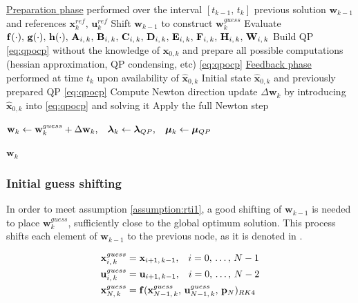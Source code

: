 \begin{algorithm}[H]
	\caption{\textsc{RTI}}\label{alg:rti}
	\centering
	\footnotesize
	\begin{algorithmic}[1]
	\Statex \underline{Preparation phase} performed over the interval $\left[t_{k-1},\,t_k\right]$
	\Require previous solution $\mathbf{w}_{k-1}$ and references $\mathbf{x}_k^{ref},\,\mathbf{u}_k^{ref}$
	\State Shift $\mathbf{w}_{k-1}$ to construct $\mathbf{w}_k^{guess}$
	\State Evaluate $\mathbf{f}(\cdot),\, \mathbf{g}(\cdot),\,\mathbf{h}(\cdot),\,\mathbf{A}_{i,\,k},\,\mathbf{B}_{i,\,k},\,\mathbf{C}_{i,\,k},\,\mathbf{D}_{i,\,k},\,\mathbf{E}_{i,\,k},\,\mathbf{F}_{i,\,k},\,\mathbf{H}_{i,\,k},\,\mathbf{W}_{i,\,k}$
	\State Build QP \eqref{eq:qpocp} without the knowledge of $\mathbf{\hat{x}}_{0, k}$ and prepare all possible computations (hessian approximation, QP condensing, etc)
	\State \Return \eqref{eq:qpocp}
	\Statex \underline{Feedback phase} performed at time $t_k$ upon availability of $\mathbf{\hat{x}}_{0, k}$
	\Require Initial state $\mathbf{\hat{x}}_{0, k}$ and previously prepared QP \eqref{eq:qpocp}
	\State Compute Newton direction update $\Delta \mathbf{w}_k$ by introducing $\mathbf{\hat{x}}_{0, k}$ into \eqref{eq:qpocp} and solving it
	\State Apply the full Newton step
	\Statex \centerline{$\mathbf{w}_k \gets \mathbf{w}_{k}^{guess} + \Delta \mathbf{w}_{k},\hspace{0.3cm}\bm{\gmultiplier}_k \gets \bm{\gmultiplier}_{QP},\hspace{0.3cm}\bm{\hmultiplier}_k \gets \bm{\hmultiplier}_{QP}$}
	\State \Return $\mathbf{w}_k$
	\end{algorithmic}
\end{algorithm}

\subsubsection*{Initial guess shifting}

In order to meet assumption \ref{assumption:rti1}, a good shifting of $\mathbf{w}_{k-1}$ is needed to place $\mathbf{w}_k^{guess}$, sufficiently close to the global optimum solution. This process shifts each element  of $\mathbf{w}_{k-1}$ to the previous node, as it is denoted in .

\begin{equation}
\begin{aligned}
\mathbf{x}_{i,\,k}^{guess} &= \mathbf{x}_{i+1,\,k-1}, \hspace{0.3cm} i = 0,\,\ldots,\,N-1\\
\mathbf{u}_{i,\,k}^{guess} &= \mathbf{u}_{i+1,\,k-1}, \hspace{0.3cm} i = 0,\,\ldots,\,N-2\\
\mathbf{x}_{N,\,k}^{guess} &= \mathbf{f}(\mathbf{x}_{N-1,\,k}^{guess},\,\mathbf{u}_{N-1,\,k}^{guess},\,\mathbf{p}_N)_{RK4}
\end{aligned}
\label{eq:shifting}
\end{equation}

